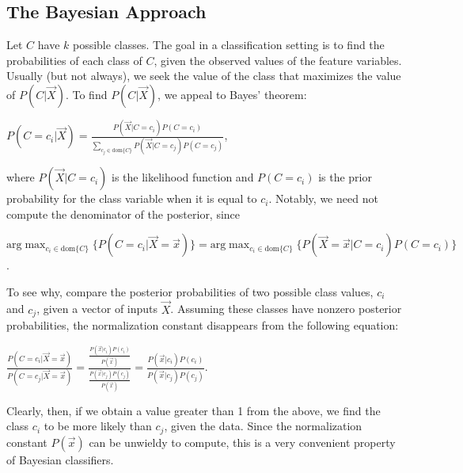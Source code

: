 \documentclass[12pt,twoside]{reedthesis}
\begin{document}
	\subsection*{The Bayesian Approach}
	Let $C$ have $k$ possible classes. 
	The goal in a classification setting is to find the probabilities of each class of $C$, given the observed values of the feature variables. Usually (but not always), we seek the value of the class that maximizes the value of $P(C | \vec{X})$. To find $P(C | \vec{X})$, we appeal to Bayes' theorem:
	\begin{center}
		$P(C = c_i | \vec{X}) = \displaystyle\frac{P(\vec{X} | C = c_i) P(C = c_i)}{\displaystyle\sum_{c_j \in \textrm{dom}\{C\}} P(\vec{X} | C = c_j)P(C=c_j)}$,
	\end{center}
	where $P(\vec{X} | C = c_i)$ is the likelihood function and $P(C = c_i)$ is the prior probability for the class variable when it is equal to $c_i$. Notably, we need not compute the denominator of the posterior, since
	\begin{center} 
	$\displaystyle\textrm{arg}\max_{c_i \in \textrm{dom}\{C\}}{\{ P(C=c_i | \vec{X} = \vec{x}) \}} = \displaystyle\textrm{arg}\max_{c_i \in \textrm{dom}\{C\}}\{ P(\vec{X} = \vec{x} | C = c_i) P(C=c_i) \}$.
	\end{center}
	To see why, compare the posterior probabilities of two possible class values, $c_i$ and $c_j$, given a vector of inputs $\vec{X}$. Assuming these classes have nonzero posterior probabilities, the normalization constant disappears from the following equation:
	\begin{center}
		$\displaystyle\frac{P(C=c_i | \vec{X} = \vec{x})}{P(C=c_j | \vec{X} = \vec{x})} = 
		\displaystyle\frac{\displaystyle\frac{P(\vec{x} | c_i)P( c_i)}{P(\vec{x})}}{\displaystyle\frac{P(\vec{x} | c_j) P( c_j)}{P(\vec{x})}} = \frac{P(\vec{x} | c_i) P( c_i)}{P(\vec{x} | c_j) P( c_j)}$.
	\end{center}
	Clearly, then, if we obtain a value greater than 1 from the above, we find the class $c_i$ to be more likely than $c_j$, given the data. Since the normalization constant $P(\vec{x})$ can be unwieldy to compute, this is a very convenient property of Bayesian classifiers. 
\end{document}
